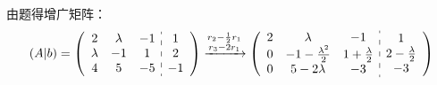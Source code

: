 \documentclass[a4paper]{report}
\begin{document}
\begin{jie}
%
%
由题得增广矩阵：
\begin{equation*}
(A|b)=\left(
 \begin{array}{c:c}
\begin{matrix}
2 & \lambda & -1 \\
\lambda & -1 & 1 \\
4 & 5 & -5
\end{matrix}&
\begin{matrix}
1  \\
2\\
-1
\end{matrix}
\end{array}
\right)
\xrightarrow{\substack{r_{2}-\frac{1}{2}r_{1}\\ r_{3}-2r_{1}}}
{
 \left(
 \begin{array}{c:c}
\begin{matrix}
2 & \lambda & -1 \\
0 & -1-\frac{\lambda^2}{2} & 1+\frac{\lambda}{2} \\
0 & 5-2\lambda & -3
\end{matrix}&
\begin{matrix}
1  \\
2-\frac{\lambda}{2}\\
-3
\end{matrix}
\end{array}
\right)
}
\end{equation*}


\end{jie}
\end{document}
